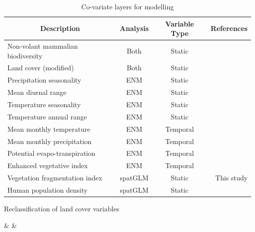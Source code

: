 \documentclass[9pt,twoside,lineno]{pnas-new}
\begin{document}
\begin{table}
\centering
\caption{Co-variate layers for modelling}
\label{table:ENM_CoV}
\begin{tabular}{l c c r}
\multicolumn{1}{c}{Description} & \multicolumn{1}{c}{Analysis} & \multicolumn{1}{c}{Variable Type} & \multicolumn{1}{c}{References}\\
\hline\hline
Non-volant mammalian biodiversity & Both & Static & \cite{IUCN2016TerrestrialData}\\
Land cover (modified) & Both & Static & \cite{Olivier2012Global2009}\\
Precipitation seasonality & ENM & Static & \cite{Frick2017WorldclimArease}\\
Mean diurnal range & ENM & Static & \cite{Frick2017WorldclimArease}\\
Temperature seasonality & ENM & Static & \cite{Frick2017WorldclimArease}\\
Temperature annual range & ENM & Static& \cite{Frick2017WorldclimArease}\\
Mean monthly temperature & ENM & Temporal & \cite{Frick2017WorldclimArease}\\
Mean monthly precipitation & ENM & Temporal & \cite{Frick2017WorldclimArease}\\
Potential evapo-transpiration & ENM & Temporal & \cite{Trabucco2009GlobalDatabase}\\
Enhanced vegetative index & ENM & Temporal & \cite{Huete2002OverviewIndices}\\
Vegetation fragmentation index & spatGLM & Static & This study \\
Human population density & spatGLM & Static & \cite{CIESIN2005GriddedGrid}\\
\end{tabular}
\end{table}
\FloatBarrier

\begin{table}[!h]
\centering
\caption{Reclassification of land cover variables}
\label{table:globReclass}

%
    	{\Value & \Label & \Class}%
\end{table}
\end{document}
